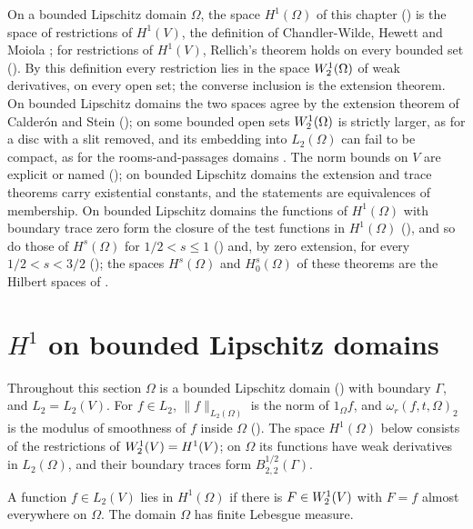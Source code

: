 On a bounded Lipschitz domain $\Omega$, the space $H^1(\Omega)$ of this chapter
() is the space of restrictions of $H^1(V)$, the definition of
Chandler-Wilde, Hewett and Moiola \cite{ChandlerWildeHewettMoiola}; for restrictions of $H^1(V)$,
Rellich's theorem holds on every bounded set (). By this definition
every restriction lies in the space $W^{1}_{2}(\Omega)$ of weak derivatives, on every open set;
the converse inclusion is the extension theorem. On bounded Lipschitz domains the two spaces
agree by the extension theorem of Calder\'on and Stein \cite[Chapter VI]{SteinSingular}
(); on some bounded open sets $W^{1}_{2}(\Omega)$ is strictly
larger, as for a disc with a slit removed, and its embedding into $L_2(\Omega)$ can fail to be
compact, as for the rooms-and-passages domains \cite[Chapter 6]{AdamsFournier}. The norm bounds
on $V$ are explicit or named (); on bounded Lipschitz domains the extension
and trace theorems carry existential constants, and the statements are equivalences of
membership. On bounded Lipschitz domains the functions of
$H^1(\Omega)$ with boundary trace zero form the closure of the test functions in $H^1(\Omega)$
\cite[Theorem 3.40]{McLean} (), and so do those of
$H^s(\Omega)$ for $1/2 < s \leq 1$ () and, by zero
extension, for every $1/2 < s < 3/2$ (); the spaces
$H^s(\Omega)$ and $H^s_0(\Omega)$ of these theorems are the Hilbert spaces of
.

\section{\texorpdfstring{$H^1$}{H\^{}1} on bounded Lipschitz domains}
\label{sec:lipschitz-domain-h1}

Throughout this section $\Omega$ is a bounded Lipschitz domain ()
with boundary $\Gamma$, and $L_2 = L_2(V)$. For $f \in L_2$, $\|f\|_{L_2(\Omega)}$ is the norm of
$1_\Omega f$, and $\omega_r(f, t, \Omega)_2$ is the modulus of smoothness of $f$ inside $\Omega$
(). The space $H^1(\Omega)$ below consists of the restrictions of
$W^{1}_{2}(V) = H^1(V)$; on $\Omega$ its functions have weak derivatives in $L_2(\Omega)$, and
their boundary traces form $B^{1/2}_{2,2}(\Gamma)$.

\begin{definition}
\label{def:sobolev-lipschitz-domain}
\leanok
{}
A function $f \in L_2(V)$ lies in $H^1(\Omega)$ if there is $F \in W^{1}_{2}(V)$ with $F = f$
almost everywhere on $\Omega$. The domain $\Omega$ has finite Lebesgue measure.
\end{definition}

